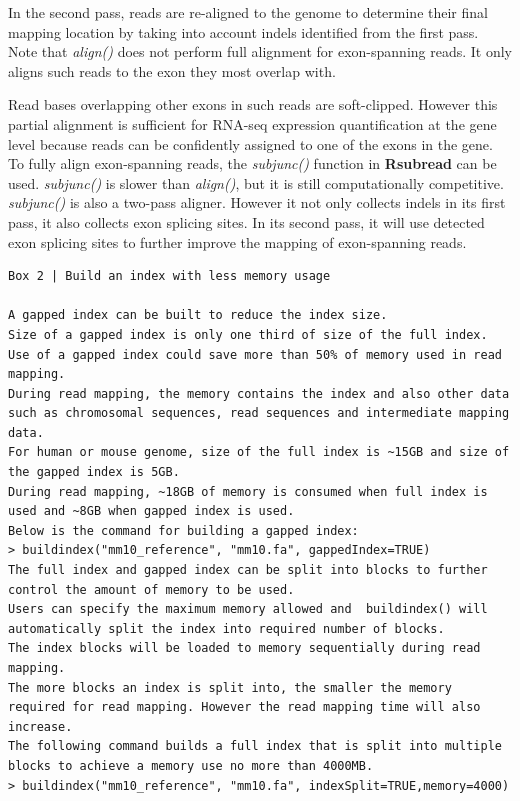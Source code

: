 \documentclass[]{book}
\begin{document}
In the second pass, reads are re-aligned to the genome to determine their final mapping location
by taking into account indels identified from the first pass. Note that \emph{align()} does not perform full alignment for exon-spanning reads. It only aligns such reads to the exon they most overlap with.

Read bases overlapping other exons in such reads are soft-clipped. However this partial alignment
is sufficient for RNA-seq expression quantification at the gene level because reads can be confidently assigned to one of the exons in the gene. To fully align exon-spanning reads, the \emph{subjunc()} function in \textbf{Rsubread} can be used. \emph{subjunc()} is slower than \emph{align()}, but it is still computationally competitive. \emph{subjunc()} is also a two-pass aligner. However it not only collects indels in its first pass, it also collects exon splicing sites. In its second pass, it will use detected exon splicing sites to further improve the mapping of exon-spanning reads.

\begin{verbatim}
Box 2 | Build an index with less memory usage

A gapped index can be built to reduce the index size. 
Size of a gapped index is only one third of size of the full index. 
Use of a gapped index could save more than 50% of memory used in read mapping. 
During read mapping, the memory contains the index and also other data such as chromosomal sequences, read sequences and intermediate mapping data. 
For human or mouse genome, size of the full index is ~15GB and size of the gapped index is 5GB. 
During read mapping, ~18GB of memory is consumed when full index is used and ~8GB when gapped index is used. 
Below is the command for building a gapped index:
> buildindex("mm10_reference", "mm10.fa", gappedIndex=TRUE)
The full index and gapped index can be split into blocks to further 
control the amount of memory to be used. 
Users can specify the maximum memory allowed and  buildindex() will 
automatically split the index into required number of blocks. 
The index blocks will be loaded to memory sequentially during read mapping. 
The more blocks an index is split into, the smaller the memory required for read mapping. However the read mapping time will also increase. 
The following command builds a full index that is split into multiple blocks to achieve a memory use no more than 4000MB.
> buildindex("mm10_reference", "mm10.fa", indexSplit=TRUE,memory=4000)
\end{verbatim}
\end{document}
